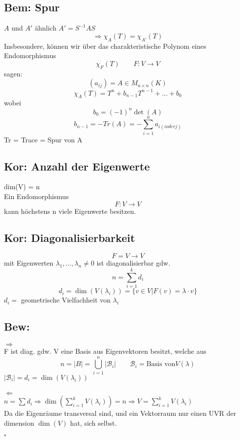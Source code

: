 \documentclass[titlepage,12pt,a4paper,ngerman]{report}
\begin{document}
\subsection{Bem: Spur} $A$ und $A'$ ähnlich $A' = S^{-1} A S $
$$\Rightarrow \chi_A (T) = \chi_{A'} (T)$$
Insbesondere, können wir über das charakteristische Polynom eines Endomorphismus
$$\chi_F(T) \qquad F: V\to V$$
sagen:
$$(a_{ij}) = A \in M_{n\times n} (K) $$
$$\chi_A(T) = T^n + b_{n-1} T^{n-1}+ \dots + b_0$$
wobei $$b_0 = (-1) ^n \det(A)$$
$$b_{n-1} = - Tr(A) = -\sum_{i=1}^{n} a_{i(i oder j)}$$
Tr = Trace = Spur von A

\subsection{Kor: Anzahl der Eigenwerte} dim(V) = n\\
Ein Endomorphismus
$$F: V\to V $$ kann höchstens n viele Eigenwerte besitzen.

\subsection{Kor: Diagonalisierbarkeit} $$F= V \to V $$
mit Eigenwerten $\lambda_1, \dots , \lambda_n \neq 0$ ist diagonalisierbar gdw.
$$n = \sum _{i=1}^k d_i$$
$$ d_i = \dim(V(\lambda_i)) = \{v\in V \vert F(v) = \lambda \cdot v\}$$
$d_i =$ geometrische Vielfachheit von $\lambda_i$

\subsection{Bew: }$\Rightarrow$ \\
F ist diag. gdw. V eine Basis aus Eigenvektoren besitzt, welche aus 
$$n = |B| = \bigcup_{i=1}^{n} |\mathcal{B}_i| \qquad \mathcal{B}_i = \textrm{Basis von} V(\lambda)$$
$\vert \mathcal{B}_i \vert = d_i = \dim(V(\lambda_i))$\\\\
$\Leftarrow$\\
$n = \sum d_i \Rightarrow \dim(\sum_{i=1}^{k} V(\lambda_i)) = n \Rightarrow V = \sum_{i=1}^k V(\lambda_i)$ \\
Da die Eigenräume transversal sind, und ein Vektorraum nur einen UVR der dimension $\dim(V)$ hat, sich selbst.
\begin{flushright}
	$\square$
\end{flushright}


\end{document}
